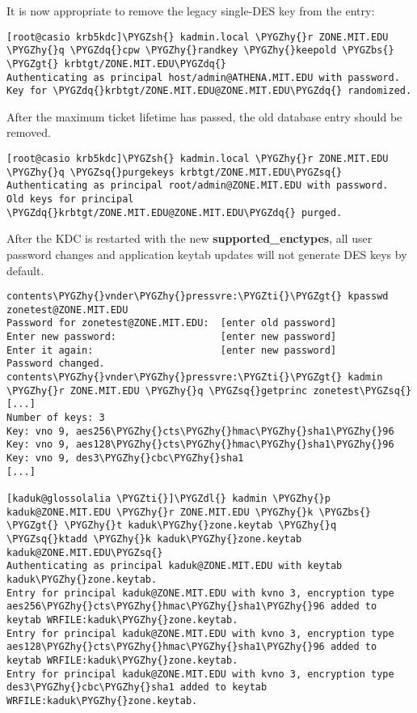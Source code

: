 \documentclass[letterpaper,10pt,english]{sphinxmanual}
\def\PYGZbs{\char`\\}
\def\PYGZgt{\char`\>}
\def\PYGZsh{\char`\#}
\def\PYGZdl{\char`\$}
\def\PYGZhy{\char`\-}
\def\PYGZsq{\char`\'}
\def\PYGZdq{\char`\"}
\def\PYGZti{\char`\~}
\begin{document}
It is now appropriate to remove the legacy single-DES key from the
 entry:

\begin{Verbatim}[commandchars=\\\{\}]
[root@casio krb5kdc]\PYGZsh{} kadmin.local \PYGZhy{}r ZONE.MIT.EDU \PYGZhy{}q \PYGZdq{}cpw \PYGZhy{}randkey \PYGZhy{}keepold \PYGZbs{}
\PYGZgt{} krbtgt/ZONE.MIT.EDU\PYGZdq{}
Authenticating as principal host/admin@ATHENA.MIT.EDU with password.
Key for \PYGZdq{}krbtgt/ZONE.MIT.EDU@ZONE.MIT.EDU\PYGZdq{} randomized.
\end{Verbatim}

After the maximum ticket lifetime has passed, the old database entry
should be removed.

\begin{Verbatim}[commandchars=\\\{\}]
[root@casio krb5kdc]\PYGZsh{} kadmin.local \PYGZhy{}r ZONE.MIT.EDU \PYGZhy{}q \PYGZsq{}purgekeys krbtgt/ZONE.MIT.EDU\PYGZsq{}
Authenticating as principal root/admin@ZONE.MIT.EDU with password.
Old keys for principal \PYGZdq{}krbtgt/ZONE.MIT.EDU@ZONE.MIT.EDU\PYGZdq{} purged.
\end{Verbatim}

After the KDC is restarted with the new \textbf{supported\_enctypes},
all user password changes and application keytab updates will not
generate DES keys by default.

\begin{Verbatim}[commandchars=\\\{\}]
contents\PYGZhy{}vnder\PYGZhy{}pressvre:\PYGZti{}\PYGZgt{} kpasswd zonetest@ZONE.MIT.EDU
Password for zonetest@ZONE.MIT.EDU:  [enter old password]
Enter new password:                  [enter new password]
Enter it again:                      [enter new password]
Password changed.
contents\PYGZhy{}vnder\PYGZhy{}pressvre:\PYGZti{}\PYGZgt{} kadmin \PYGZhy{}r ZONE.MIT.EDU \PYGZhy{}q \PYGZsq{}getprinc zonetest\PYGZsq{}
[...]
Number of keys: 3
Key: vno 9, aes256\PYGZhy{}cts\PYGZhy{}hmac\PYGZhy{}sha1\PYGZhy{}96
Key: vno 9, aes128\PYGZhy{}cts\PYGZhy{}hmac\PYGZhy{}sha1\PYGZhy{}96
Key: vno 9, des3\PYGZhy{}cbc\PYGZhy{}sha1
[...]

[kaduk@glossolalia \PYGZti{}]\PYGZdl{} kadmin \PYGZhy{}p kaduk@ZONE.MIT.EDU \PYGZhy{}r ZONE.MIT.EDU \PYGZhy{}k \PYGZbs{}
\PYGZgt{} \PYGZhy{}t kaduk\PYGZhy{}zone.keytab \PYGZhy{}q \PYGZsq{}ktadd \PYGZhy{}k kaduk\PYGZhy{}zone.keytab kaduk@ZONE.MIT.EDU\PYGZsq{}
Authenticating as principal kaduk@ZONE.MIT.EDU with keytab kaduk\PYGZhy{}zone.keytab.
Entry for principal kaduk@ZONE.MIT.EDU with kvno 3, encryption type aes256\PYGZhy{}cts\PYGZhy{}hmac\PYGZhy{}sha1\PYGZhy{}96 added to keytab WRFILE:kaduk\PYGZhy{}zone.keytab.
Entry for principal kaduk@ZONE.MIT.EDU with kvno 3, encryption type aes128\PYGZhy{}cts\PYGZhy{}hmac\PYGZhy{}sha1\PYGZhy{}96 added to keytab WRFILE:kaduk\PYGZhy{}zone.keytab.
Entry for principal kaduk@ZONE.MIT.EDU with kvno 3, encryption type des3\PYGZhy{}cbc\PYGZhy{}sha1 added to keytab WRFILE:kaduk\PYGZhy{}zone.keytab.
\end{Verbatim}
\end{document}
